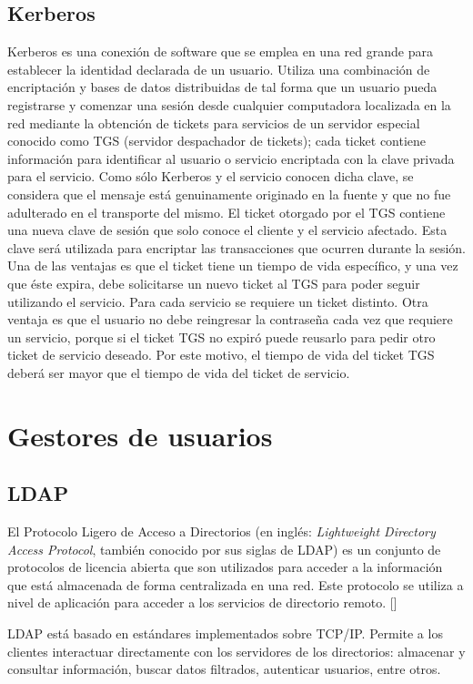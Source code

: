 \subsection*{Kerberos}
Kerberos es una conexión de software que se emplea en una red grande para establecer la identidad declarada de un usuario. Utiliza una combinación de encriptación y bases de datos distribuidas de tal forma que un usuario pueda registrarse y comenzar una sesión desde cualquier computadora localizada en la red mediante la obtención de tickets para servicios de un servidor especial conocido como TGS (servidor despachador de tickets); cada ticket contiene información para identificar al usuario o servicio encriptada con la clave privada para el servicio. Como sólo Kerberos y el servicio conocen dicha clave, se considera que el mensaje está genuinamente originado en la fuente y que no fue adulterado en el transporte del mismo. El ticket otorgado por el TGS contiene una nueva clave de sesión que solo conoce el cliente y el servicio afectado. Esta clave será utilizada para encriptar las transacciones que ocurren durante la sesión.
Una de las ventajas es que el ticket tiene un tiempo de vida específico, y una vez que éste expira, debe solicitarse un nuevo ticket al TGS para poder seguir utilizando el servicio. Para cada servicio se requiere un ticket distinto. Otra ventaja es que el usuario no debe reingresar la contraseña cada vez que requiere un servicio, porque si el ticket TGS no expiró puede reusarlo para pedir otro ticket de servicio deseado. Por este motivo, el tiempo de vida del ticket TGS deberá ser mayor que el tiempo de vida del ticket de servicio.

\section*{Gestores de usuarios}

\subsection*{LDAP}
El Protocolo Ligero de Acceso a Directorios (en inglés: \textit{Lightweight Directory Access Protocol}, también conocido por sus siglas de LDAP) es un conjunto de protocolos de licencia abierta que son utilizados para acceder a la información que está almacenada de forma centralizada en una red. Este protocolo se utiliza a nivel de aplicación para acceder a los servicios de directorio remoto. [\cite{ldap-doc}]

LDAP está basado en estándares implementados sobre TCP/IP. Permite a los clientes interactuar directamente con los servidores de los directorios: almacenar y consultar información, buscar datos filtrados, autenticar usuarios, entre otros.

